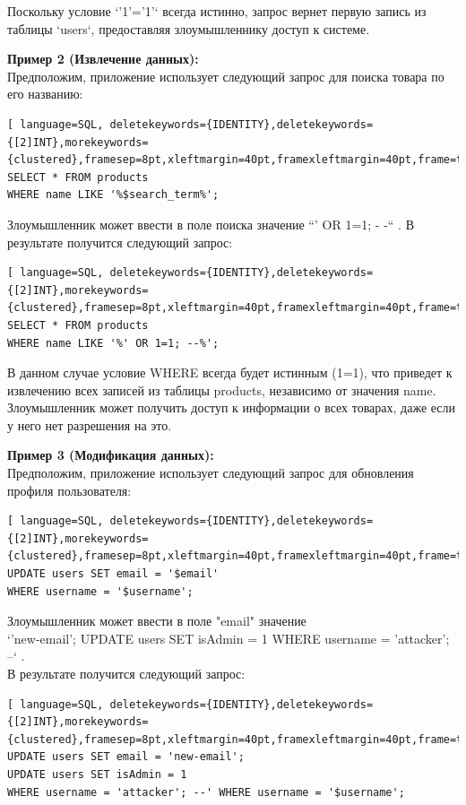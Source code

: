 \documentclass[a4paper,12pt]{diplom}
\begin{document}
	Поскольку условие `'1'='1'` всегда истинно, запрос вернет первую запись из таблицы `users`,  предоставляя злоумышленнику доступ к системе.
	
	\textbf{Пример 2 (Извлечение данных):}\\
	Предположим, приложение использует следующий запрос для поиска товара по его названию:
	\begin{lstlisting}[ language=SQL, deletekeywords={IDENTITY},deletekeywords={[2]INT},morekeywords={clustered},framesep=8pt,xleftmargin=40pt,framexleftmargin=40pt,frame=tb,framerule=0pt]    
SELECT * FROM products 
WHERE name LIKE '%$search_term%';
	\end{lstlisting}  
	Злоумышленник может ввести в поле поиска значение ``' OR 1=1; - -`` . В результате получится следующий запрос: 
	\begin{lstlisting}[ language=SQL, deletekeywords={IDENTITY},deletekeywords={[2]INT},morekeywords={clustered},framesep=8pt,xleftmargin=40pt,framexleftmargin=40pt,frame=tb,framerule=0pt]    
SELECT * FROM products 
WHERE name LIKE '%' OR 1=1; --%'; 
	\end{lstlisting}  
	В данном случае условие WHERE всегда будет истинным (1=1), что приведет к извлечению всех записей из таблицы products, независимо от значения name. Злоумышленник может получить доступ к информации о всех товарах, даже если у него нет разрешения на это.
	
	\textbf{Пример 3 (Модификация данных):}\\
	Предположим, приложение использует следующий запрос для обновления профиля пользователя:
	\begin{lstlisting}[ language=SQL, deletekeywords={IDENTITY},deletekeywords={[2]INT},morekeywords={clustered},framesep=8pt,xleftmargin=40pt,framexleftmargin=40pt,frame=tb,framerule=0pt]		
UPDATE users SET email = '$email' 
WHERE username = '$username';
	\end{lstlisting}
	
	Злоумышленник может ввести в поле "email" значение \\
	`'new-email'; UPDATE users SET isAdmin = 1 WHERE username = 'attacker'; --` . \\
	В результате получится следующий запрос:
	
	\begin{lstlisting}[ language=SQL, deletekeywords={IDENTITY},deletekeywords={[2]INT},morekeywords={clustered},framesep=8pt,xleftmargin=40pt,framexleftmargin=40pt,frame=tb,framerule=0pt]		
UPDATE users SET email = 'new-email'; 
UPDATE users SET isAdmin = 1
WHERE username = 'attacker'; --' WHERE username = '$username';
	\end{lstlisting}
	
\end{document}
